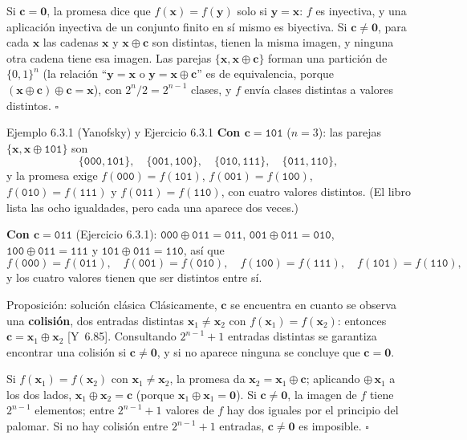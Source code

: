 \documentclass[11pt, a4paper, twoside, openright]{report}
\newcommand{\bx}{\mathbf{x}}
\newcommand{\by}{\mathbf{y}}
\newcommand{\bc}{\mathbf{c}}
\newcommand{\bcero}{\mathbf{0}}
\newcommand{\bits}[1]{\{0,1\}^{#1}}
\newcommand{\Yan}[1]{\textcolor{rosaviejo}{\small[Y~#1]}}  %
\begin{document}
\begin{demo}
Si $\bc = \bcero$, la promesa dice que $f(\bx) = f(\by)$ solo si $\by = \bx$: $f$ es inyectiva, y una aplicación inyectiva de un conjunto finito en sí mismo es biyectiva. Si $\bc\neq\bcero$, para cada $\bx$ las cadenas $\bx$ y $\bx\oplus\bc$ son distintas, tienen la misma imagen, y ninguna otra cadena tiene esa imagen. Las parejas $\{\bx, \bx\oplus\bc\}$ forman una partición de $\bits{n}$ (la relación ``$\by = \bx$ o $\by = \bx\oplus\bc$'' es de equivalencia, porque $(\bx\oplus\bc)\oplus\bc = \bx$), con $2^n/2 = 2^{n-1}$ clases, y $f$ envía clases distintas a valores distintos. \hfill$\square$
\end{demo}

\begin{ejemplo}{Ejemplo 6.3.1 (Yanofsky) y Ejercicio 6.3.1}
\textbf{Con $\bc = \texttt{101}$} ($n = 3$): las parejas $\{\bx, \bx\oplus\texttt{101}\}$ son
\[ \{\texttt{000}, \texttt{101}\}, \quad \{\texttt{001}, \texttt{100}\}, \quad \{\texttt{010}, \texttt{111}\}, \quad \{\texttt{011}, \texttt{110}\}, \]
y la promesa exige $f(\texttt{000}) = f(\texttt{101})$, $f(\texttt{001}) = f(\texttt{100})$, $f(\texttt{010}) = f(\texttt{111})$ y $f(\texttt{011}) = f(\texttt{110})$, con cuatro valores distintos. (El libro lista las ocho igualdades, pero cada una aparece dos veces.)

\textbf{Con $\bc = \texttt{011}$} (Ejercicio 6.3.1): $\texttt{000}\oplus\texttt{011} = \texttt{011}$, $\texttt{001}\oplus\texttt{011} = \texttt{010}$, $\texttt{100}\oplus\texttt{011} = \texttt{111}$ y $\texttt{101}\oplus\texttt{011} = \texttt{110}$, así que
\[ f(\texttt{000}) = f(\texttt{011}), \quad f(\texttt{001}) = f(\texttt{010}), \quad f(\texttt{100}) = f(\texttt{111}), \quad f(\texttt{101}) = f(\texttt{110}), \]
y los cuatro valores tienen que ser distintos entre sí.
\end{ejemplo}

\begin{teoria}{Proposición: solución clásica}
Clásicamente, $\bc$ se encuentra en cuanto se observa una \textbf{colisión}, dos entradas distintas $\bx_1\neq\bx_2$ con $f(\bx_1) = f(\bx_2)$: entonces $\bc = \bx_1\oplus\bx_2$ \Yan{6.85}. Consultando $2^{n-1}+1$ entradas distintas se garantiza encontrar una colisión si $\bc\neq\bcero$, y si no aparece ninguna se concluye que $\bc = \bcero$.
\end{teoria}

\begin{demo}
Si $f(\bx_1) = f(\bx_2)$ con $\bx_1\neq\bx_2$, la promesa da $\bx_2 = \bx_1\oplus\bc$; aplicando $\oplus\,\bx_1$ a los dos lados, $\bx_1\oplus\bx_2 = \bc$ (porque $\bx_1\oplus\bx_1 = \bcero$). Si $\bc\neq\bcero$, la imagen de $f$ tiene $2^{n-1}$ elementos; entre $2^{n-1}+1$ valores de $f$ hay dos iguales por el principio del palomar. Si no hay colisión entre $2^{n-1}+1$ entradas, $\bc\neq\bcero$ es imposible. \hfill$\square$
\end{demo}
\end{document}

